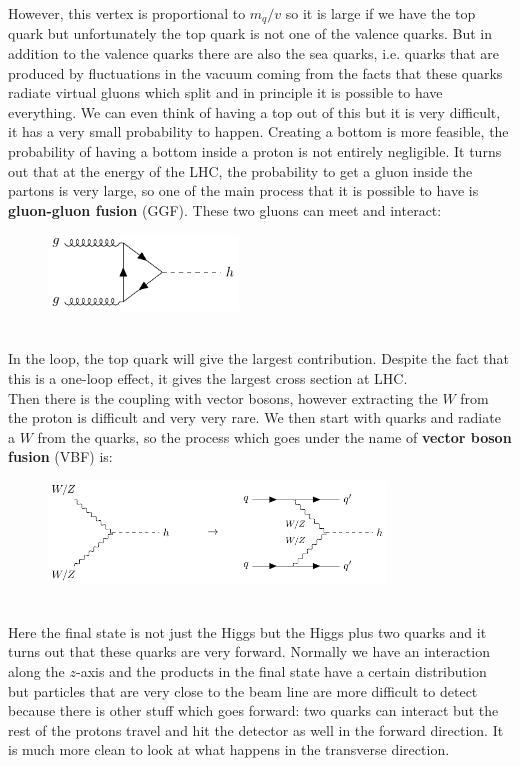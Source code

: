 \documentclass[../main.tex]{subfiles}
\begin{document}
However, this vertex is proportional to $m_q/v$ so it is large if we have the top quark but unfortunately the top quark is not one of the valence quarks. But in addition to the valence quarks there are also the sea quarks, i.e. quarks that are produced by fluctuations in the vacuum coming from the facts that these quarks radiate  virtual gluons which split and in principle it is possible to have everything. We can even think of having a top out of this but it is very difficult, it has a very small probability to happen. Creating a bottom is more feasible, the probability of having a bottom inside a proton is not entirely negligible. It turns out that at the energy of the LHC, the probability to get a gluon inside the partons is very large, so one of the main process that it is possible to have is \textbf{gluon-gluon fusion} (GGF). These two gluons can meet and interact: 
\begin{figure}[h]
    \centering
    \includegraphics[width=0.45\textwidth]{Images/ggf.pdf}
    \caption*{}
\end{figure}\\
In the loop, the top quark will give the largest contribution. Despite the fact that this is a one-loop effect, it gives the largest cross section at LHC.\\
Then there is the coupling with vector bosons, however extracting the $W$ from the proton is difficult and very very rare. We then start with quarks and radiate a $W$ from the quarks, so the process which goes under the name of \textbf{vector boson fusion} (VBF) is:
\begin{figure}[h]
    \centering
    \includegraphics[width=0.8\textwidth]{Images/vbf.pdf}
    \caption*{}
\end{figure}\\
Here the final state is not just the Higgs but the Higgs plus two quarks and it turns out that these quarks are very forward. Normally we have an interaction along the $z$-axis and the products in the final state have a certain distribution but particles that are very close to the beam line are more difficult to detect because there is other stuff which goes forward: two quarks can interact but the rest of the protons travel and hit the detector as well in the forward direction. It is much more clean to look at what happens in the transverse direction.\\
\end{document}
